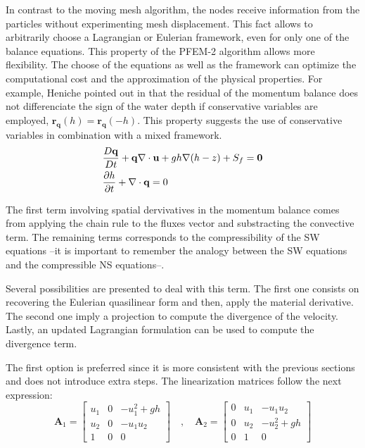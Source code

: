 In contrast to the moving mesh algorithm, the nodes receive information from the particles without experimenting mesh displacement.
This fact allows to arbitrarily choose a Lagrangian or Eulerian framework, even for only one of the balance equations.
This property of the PFEM-2 algorithm allows more flexibility. The choose of the equations as well as the framework can optimize the computational cost and the approximation of the physical properties.
For example, Heniche pointed out in \cite{heniche2000} that the residual of the momentum balance does not differenciate the sign of the water depth if conservative variables are employed, $\mathbf{r}_\mathbf{q}(h) = \mathbf{r}_\mathbf{q}(-h)$.
This property suggests the use of conservative variables in combination with a mixed framework.
\begin{subequations} \label{pfem2_sw_eq}
\begin{align}
    &\frac{D\mathbf{q}}{Dt} + \mathbf{q} \nabla \cdot \mathbf{u} + gh \nabla (h-z) + S_f = \mathbf{0} \\
    &\frac{\partial h}{\partial t} + \nabla \cdot \mathbf{q} = 0
\end{align}
\end{subequations}


The first term involving spatial dervivatives in the momentum balance comes from applying the chain rule to the fluxes vector and substracting the convective term. The remaining terms corresponds to the compressibility of the SW equations --it is important to remember the analogy between the SW equations and the compressible NS equations--.

Several possibilities are presented to deal with this term. The first one consists on recovering the Eulerian quasilinear form and then, apply the material derivative. The second one imply a projection to compute the divergence of the velocity. Lastly, an updated Lagrangian formulation can be used to compute the divergence term.

The first option is preferred since it is more consistent with the previous sections and does not introduce extra steps. The linearization matrices follow the next expression:
\begin{equation}
    \mathbf{A}_1 = \left[\begin{matrix}
        u_1  & 0   & -u_1^2 + gh \\
        u_2  & 0   & -u_1 u_2 \\
        1    & 0   & 0
    \end{matrix} \right]
    \quad , \quad
    \mathbf{A}_2 = \left[\begin{matrix}
        0   & u_1  & -u_1 u_2 \\
        0   & u_2  & -u_2^2 + gh \\
        0   & 1    & 0
    \end{matrix} \right]
\end{equation}




